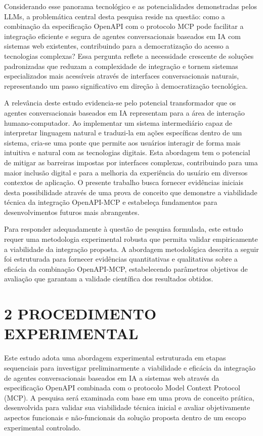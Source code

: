 \documentclass[
]{article}
\begin{document}
Considerando esse panorama tecnológico e as potencialidades demonstradas
pelos LLMs, a problemática central desta pesquisa reside na questão:
como a combinação da especificação OpenAPI com o protocolo MCP pode
facilitar a integração eficiente e segura de agentes conversacionais
baseados em IA com sistemas web existentes, contribuindo para a
democratização do acesso a tecnologias complexas? Essa pergunta reflete
a necessidade crescente de soluções padronizadas que reduzam a
complexidade de integração e tornem sistemas especializados mais
acessíveis através de interfaces conversacionais naturais, representando
um passo significativo em direção à democratização tecnológica.

A relevância deste estudo evidencia-se pelo potencial transformador que
os agentes conversacionais baseados em IA representam para a área de
interação humano-computador. Ao implementar um sistema intermediário
capaz de interpretar linguagem natural e traduzi-la em ações específicas
dentro de um sistema, cria-se uma ponte que permite aos usuários
interagir de forma mais intuitiva e natural com as tecnologias digitais.
Esta abordagem tem o potencial de mitigar as barreiras impostas por
interfaces complexas, contribuindo para uma maior inclusão digital e
para a melhoria da experiência do usuário em diversos contextos de
aplicação. O presente trabalho busca fornecer evidências iniciais desta
possibilidade através de uma prova de conceito que demonstre a
viabilidade técnica da integração OpenAPI-MCP e estabeleça fundamentos
para desenvolvimentos futuros mais abrangentes.

Para responder adequadamente à questão de pesquisa formulada, este
estudo requer uma metodologia experimental robusta que permita validar
empiricamente a viabilidade da integração proposta. A abordagem
metodológica descrita a seguir foi estruturada para fornecer evidências
quantitativas e qualitativas sobre a eficácia da combinação OpenAPI-MCP,
estabelecendo parâmetros objetivos de avaliação que garantam a validade
científica dos resultados obtidos.

\section{2 PROCEDIMENTO EXPERIMENTAL}\label{procedimento-experimental}

Este estudo adota uma abordagem experimental estruturada em etapas
sequenciais para investigar preliminarmente a viabilidade e eficácia da
integração de agentes conversacionais baseados em IA a sistemas web
através da especificação OpenAPI combinada com o protocolo Model Context
Protocol (MCP). A pesquisa será examinada com base em uma prova de
conceito prática, desenvolvida para validar sua viabilidade técnica
inicial e avaliar objetivamente aspectos funcionais e não-funcionais da
solução proposta dentro de um escopo experimental controlado.
\end{document}
